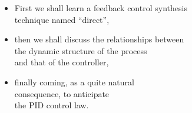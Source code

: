 \begin{frame}\mccz
{}
\framesubtitleTC{}
\myPause
 \begin{columns}
   \begin{itemize}[<+-| alert@+>]
   \item First we shall learn a feedback control synthesis\\
         technique named ``direct'',
   \item then we shall discuss the relationships between\\
         the dynamic structure of the process\\
         and that of the controller,
   \item finally coming, as a quite natural\\
         consequence, to anticipate\\
         the PID control law. 
   \end{itemize}
 \end{columns}
\end{frame}


